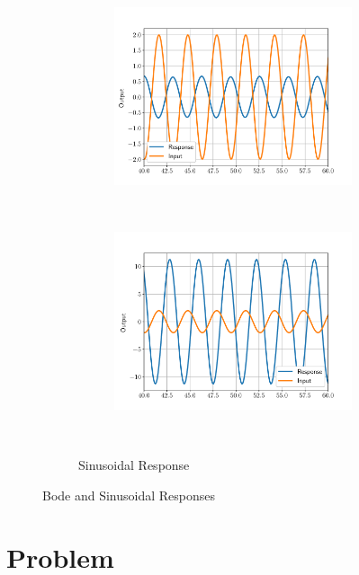 \documentclass[11pt, reqno]{article}    %
\begin{document}
\begin{figure}[h]
\begin{subfigure}{0.38\textwidth}
\begin{subfigure}[htbp]{\textwidth}
            \includegraphics[width=\textwidth]{figures/G1_sinusoidal.pdf} 
        \end{subfigure} \\
        \begin{subfigure}[htbp]{\textwidth} 
            \includegraphics[width=\textwidth]{figures/G3_response.pdf} 
        \end{subfigure} 
        \caption{Sinusoidal Response}~\label{fig:sinusoidal_match}
    \end{subfigure}
    \caption{ Bode and Sinusoidal Responses}
\end{figure}
\clearpage
\section{Problem}
\end{document}
